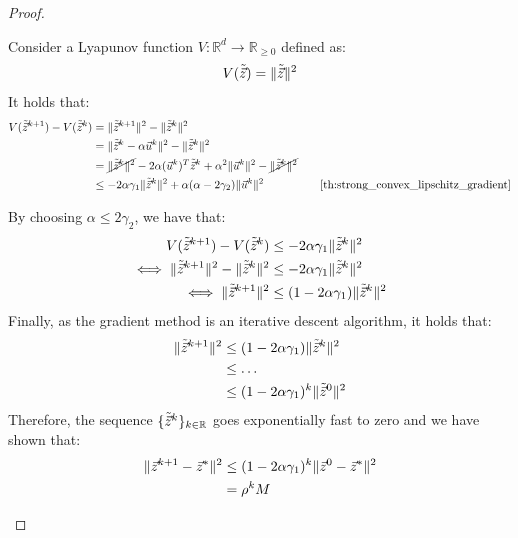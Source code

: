 \begin{theorem}
\begin{proof}
\begin{enumerate}
                Consider a Lyapunov function $V: \mathbb{R}^d \rightarrow \mathbb{R}_{\geq 0}$ defined as:
                \[
                    V(\tilde{{\vec{z}}}) = \Vert \tilde{{\vec{z}}} \Vert^2
                \]
                It holds that:
                \[
                    \begin{aligned}
                        V(\tilde{\z}^{k+1}) - V(\tilde{\z}^k) &= \Vert \tilde{\z}^{k+1} \Vert^2 - \Vert \tilde{\z}^k \Vert^2 \\
                        &= \Vert \tilde{\z}^{k} - \alpha \vec{u}^{k} \Vert^2 - \Vert \tilde{\z}^k \Vert^2 \\
                        &= \cancel{\Vert \tilde{\z}^k \Vert^2} - 2\alpha(\vec{u}^k)^T\tilde{\z}^k + \alpha^2 \Vert \vec{u}^k \Vert^2 - \cancel{\Vert \tilde{\z}^k \Vert^2} \\
                        &\leq -2\alpha\gamma_1 \Vert\tilde{\z}^k\Vert^2 + \alpha(\alpha-2\gamma_2) \Vert\vec{u}^k\Vert^2 &&& \text{\Cref{th:strong_convex_lipschitz_gradient}} 
                    \end{aligned}
                \]

                By choosing $\alpha \leq 2\gamma_2$, we have that:
                \[
                    \begin{split}
                        V(\tilde{{\vec{z}}}^{k+1}) - V(\tilde{{\vec{z}}}^k) &\leq -2\alpha\gamma_1 \Vert \tilde{{\vec{z}}}^k \Vert^2 \\
                        \iff \Vert \tilde{{\vec{z}}}^{k+1} \Vert^2 - \Vert \tilde{{\vec{z}}}^k \Vert^2 &\leq -2\alpha\gamma_1 \Vert \tilde{{\vec{z}}}^k \Vert^2 \\
                        \iff \Vert \tilde{{\vec{z}}}^{k+1} \Vert^2 &\leq (1-2\alpha\gamma_1) \Vert \tilde{{\vec{z}}}^k \Vert^2 \\
                    \end{split}
                \]
                Finally, as the gradient method is an iterative descent algorithm, it holds that:
                \[
                    \begin{split}
                        \Vert \tilde{{\vec{z}}}^{k+1} \Vert^2 &\leq (1-2\alpha\gamma_1) \Vert \tilde{{\vec{z}}}^k \Vert^2 \\
                        &\leq \dots \\
                        &\leq (1-2\alpha\gamma_1)^k \Vert \tilde{{\vec{z}}}^0 \Vert^2 \\
                    \end{split}
                \]
                Therefore, the sequence $\{ \tilde{{\vec{z}}}^k \}_{k \in \mathbb{R}}$ goes exponentially fast to zero and we have shown that:
                \[
                    \begin{split}
                        \Vert {\vec{z}}^{k+1} - {\vec{z}}^* \Vert^2 &\leq (1-2\alpha\gamma_1)^k \Vert {\vec{z}}^0 - {\vec{z}}^* \Vert^2 \\
                        &= \rho^k M
                    \end{split}
                \]
        \end{enumerate}
    \end{proof}
\end{theorem}


